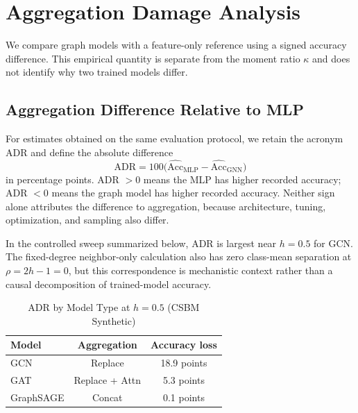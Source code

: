 
\section{Aggregation Damage Analysis}
\label{sec:adr}

We compare graph models with a feature-only reference using a signed accuracy difference. This empirical quantity is separate from the moment ratio $\kappa$ and does not identify why two trained models differ.

\subsection{Aggregation Difference Relative to MLP}

\begin{definition}
For estimates obtained on the same evaluation protocol, we retain the acronym ADR and define the absolute difference
\begin{equation}
    \text{ADR} = 100\bigl(\widehat{\mathrm{Acc}}_{\mathrm{MLP}}
    - \widehat{\mathrm{Acc}}_{\mathrm{GNN}}\bigr)
\end{equation}
in percentage points. ADR $>0$ means the MLP has higher recorded accuracy; ADR $<0$ means the graph model has higher recorded accuracy. Neither sign alone attributes the difference to aggregation, because architecture, tuning, optimization, and sampling also differ.
\end{definition}

In the controlled sweep summarized below, ADR is largest near $h=0.5$ for GCN. The fixed-degree neighbor-only calculation also has zero class-mean separation at $\rho=2h-1=0$, but this correspondence is mechanistic context rather than a causal decomposition of trained-model accuracy.

\begin{table}[t]
\centering
\caption{ADR by Model Type at $h=0.5$ (CSBM Synthetic)}
\label{tab:adr}
\begin{tabular}{@{}lcc@{}}
\toprule
\textbf{Model} & \textbf{Aggregation} & \textbf{Accuracy loss} \\
\midrule
GCN & Replace & 18.9 points \\
GAT & Replace + Attn & 5.3 points \\
GraphSAGE & Concat & 0.1 points \\
\bottomrule
\end{tabular}
\end{table}

